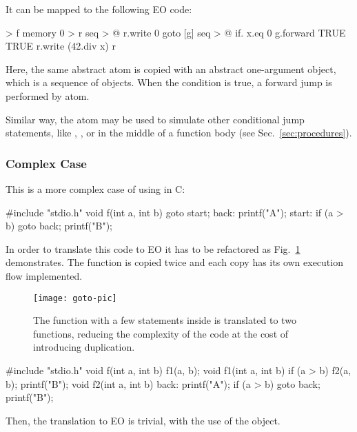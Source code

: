 \documentclass[sigplan,11pt,nonacm,natbib=false]{acmart}
\begin{document}
It can be mapped to the following EO code:

\begin{ffcode}
[x] > f
  memory 0 > r
  seq > @
    r.write 0
    goto
      [g]
        seq > @
          if.
            x.eq 0
            g.forward TRUE
            TRUE
          r.write (42.div x)
    r
\end{ffcode}

Here, the same abstract atom  is copied with an abstract one-argument object, which is a sequence of objects. When the condition is true, a forward jump is performed by  atom.

Similar way, the atom  may be used to simulate other conditional jump statements, like , , or  in the middle of a function body (see Sec.~\ref{sec:procedures}).

\subsubsection{Complex Case}

This is a more complex case of using  in C:

\begin{ffcode}
#include "stdio.h"
void f(int a, int b) {
  goto start;
back:
  printf("A");
start:
  if (a > b) goto back;
  printf("B");
}
\end{ffcode}

In order to translate this code to EO it has to be refactored as Fig.~\ref{fig:goto} demonstrates. The function  is copied twice and each copy has its own execution flow implemented.

\begin{figure}
\texttt{[image: goto-pic]}
\caption{The function  with a few  statements inside is translated to two functions, reducing the complexity of the code at the cost of introducing duplication.}
\label{fig:goto}
\end{figure}

\begin{ffcode}
#include "stdio.h"
void f(int a, int b) { f1(a, b); }
void f1(int a, int b) {
  if (a > b) f2(a, b);
  printf("B");
}
void f2(int a, int b) {
back:
  printf("A");
  if (a > b) goto back;
  printf("B");
}
\end{ffcode}

Then, the translation to EO is trivial, with the use of the  object.
\end{document}
